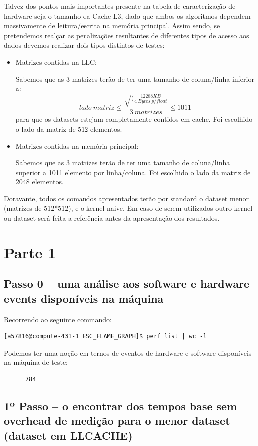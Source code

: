 \documentclass[conference,compsoc]{IEEEtran}
\begin{document}
  Talvez dos pontos mais importantes presente na tabela de caracterização de hardware seja o tamanho da Cache L3, dado que ambos os algoritmos dependem massivamente de leitura/escrita na memória principal. Assim sendo, se pretendemos realçar as penalizações resultantes de diferentes tipos de acesso aos dados devemos realizar dois tipos distintos de testes:
  \begin{itemize}
  \item Matrizes contidas na LLC: \par Sabemos que as 3 matrizes terão de ter uma tamanho de coluna/linha inferior a: \[lado\ matriz \leq \frac{\sqrt{(\frac{12288KB}{4\ Bytes\ p/ float}}}{3\ matrizes} \leq 1011\] para que os datasets estejam completamente contidos em cache. Foi escolhido o lado da matriz de 512 elementos.
      \item Matrizes contidas na memória principal: \par 
      Sabemos que as 3 matrizes terão de ter uma tamanho de coluna/linha superior a 1011 elemento por linha/coluna. Foi escolhido o lado da matriz de 2048 elementos.\par
      \end{itemize}
      Doravante, todos os comandos apresentados terão por standard o dataset menor (matrizes de 512*512), e o kernel naive. Em caso de serem utilizados outro kernel ou dataset será feita a referência antes da apresentação dos resultados.


      \section{Parte 1 }

      \subsection{Passo 0 -- uma análise aos software e hardware events disponíveis na máquina}
      Recorrendo ao seguinte commando:
      \begin{lstlisting}[style=command]
      [a57816@compute-431-1 ESC_FLAME_GRAPH]$ perf list | wc -l   
      \end{lstlisting}
      Podemos ter uma noção em ternos de eventos de hardware e software disponíveis na máquina de teste:
      \begin{lstlisting}
      784
      \end{lstlisting}

      \subsection{1º Passo -- o encontrar dos tempos base sem overhead de medição para o menor dataset (dataset em LLCACHE)}
\end{document}
